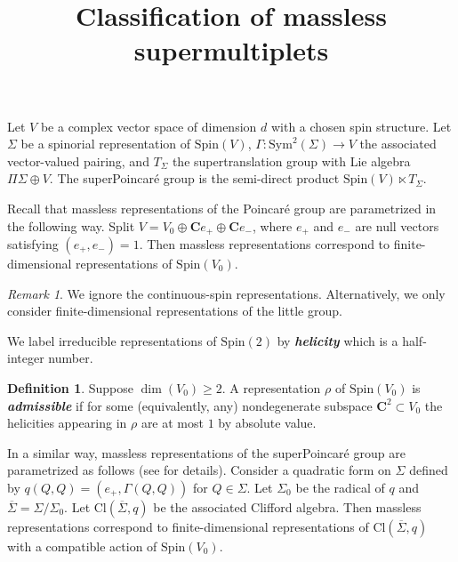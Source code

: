 \documentclass[12pt]{amsart}
\newcommand{\C}{\mathbf{C}}
\newcommand{\Cl}{\mathrm{Cl}}
\newcommand{\Spin}{\mathrm{Spin}}
\newcommand{\Sym}{\mathrm{Sym}}
\newcommand{\defterm}[1]{\textbf{\emph{#1}}}
\theoremstyle{definition}
\newtheorem{defn}[thm]{Definition}
\theoremstyle{remark}
\newtheorem{remark}[thm]{Remark}
\begin{document}
\title{Classification of massless supermultiplets}
\maketitle

\section{}

Let $V$ be a complex vector space of dimension $d$ with a chosen spin structure. Let $\Sigma$ be a spinorial representation of $\Spin(V)$, $\Gamma\colon \Sym^2(\Sigma)\rightarrow V$ the associated vector-valued pairing, and $T_\Sigma$ the supertranslation group with Lie algebra $\Pi\Sigma\oplus V$. The superPoincar\'{e} group is the semi-direct product $\Spin(V)\ltimes T_\Sigma$.

Recall that massless representations of the Poincar\'{e} group are parametrized in the following way. Split $V = V_0\oplus \C e_+\oplus \C e_-$, where $e_+$ and $e_-$ are null vectors satisfying $(e_+, e_-) = 1$. Then massless representations correspond to finite-dimensional representations of $\Spin(V_0)$.

\begin{remark}
We ignore the continuous-spin representations. Alternatively, we only consider finite-dimensional representations of the little group.
\end{remark}

We label irreducible representations of $\Spin(2)$ by \defterm{helicity} which is a half-integer number.

\begin{defn}
Suppose $\dim(V_0)\geq 2$. A representation $\rho$ of $\Spin(V_0)$ is \defterm{admissible} if for some (equivalently, any) nondegenerate subspace $\C^2\subset V_0$ the helicities appearing in $\rho$ are at most $1$ by absolute value.
\end{defn}

In a similar way, massless representations of the superPoincar\'{e} group are parametrized as follows (see \cite[Lecture 6]{Freed} for details). Consider a quadratic form on $\Sigma$ defined by $q(Q, Q) = (e_+, \Gamma(Q, Q))$ for $Q\in \Sigma$. Let $\Sigma_0$ be the radical of $q$ and $\overline{\Sigma} = \Sigma / \Sigma_0$. Let $\Cl(\overline{\Sigma}, q)$ be the associated Clifford algebra. Then massless representations correspond to finite-dimensional representations of $\Cl(\overline{\Sigma}, q)$ with a compatible action of $\Spin(V_0)$.
\end{document}
